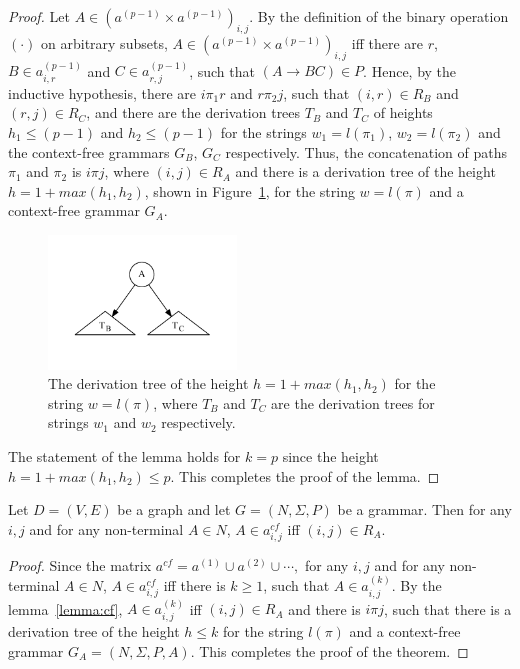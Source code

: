 \begin{proof}
Let $A \in (a^{(p-1)} \times a^{(p-1)})_{i,j}$. By the definition of the binary operation $(\cdot)$ on arbitrary subsets, $A \in (a^{(p-1)} \times a^{(p-1)})_{i,j}$ iff there are $r$, $B \in a^{(p-1)}_{i,r}$ and $C \in a^{(p-1)}_{r,j}$, such that $(A \rightarrow B C) \in P$. Hence, by the inductive hypothesis, there are $i \pi_1 r$ and $r \pi_2 j$, such that $(i,r) \in R_B$ and $(r,j) \in R_C$, and there are the derivation trees $T_B$ and $T_C$ of heights $h_1 \leq (p-1)$ and $h_2 \leq (p-1)$ for the strings $w_1 = l(\pi_1)$, $w_2 = l(\pi_2)$ and the context-free grammars $G_B$, $G_C$ respectively. Thus, the concatenation of paths $\pi_1$ and $\pi_2$ is $i \pi j$, where $(i,j) \in R_A$ and there is a derivation tree of the height $h = 1 + max(h_1, h_2)$, shown in Figure~\ref{tree2}, for the string $w = l(\pi)$ and a context-free grammar $G_A$.

\begin{figure}[h!]
 \centering
 \includegraphics[width=5cm]{pictures/tree2.pdf}
 \caption{The derivation tree of the height $h = 1 + max(h_1, h_2)$ for the string $w = l(\pi)$, where $T_B$ and $T_C$ are the derivation trees for strings $w_1$ and $w_2$ respectively.}
 \label{tree2}
\end{figure}

The statement of the lemma holds for $k = p$ since the height $h = 1 + max(h_1, h_2) \leq p$. This completes the proof of the lemma.
\end{proof}

\begin{mytheorem}\label{thm:correct}
 Let $D = (V,E)$ be a graph and let $G =(N,\Sigma,P)$ be a grammar. Then for any $i, j$ and for any non-terminal $A \in N$, $A \in a^{cf}_{i,j}$ iff $(i,j) \in R_A$.
\end{mytheorem}
\begin{proof}

Since the matrix $a^{cf} = a^{(1)} \cup a^{(2)} \cup \cdots,$ for any $i, j$ and for any non-terminal $A \in N$, $A \in a^{cf}_{i,j}$ iff there is $k \geq 1$, such that $A \in a^{(k)}_{i,j}$. By the lemma~\ref{lemma:cf}, $A \in a^{(k)}_{i,j}$ iff $(i,j) \in R_A$ and there is $i \pi j$, such that there is a derivation tree of the height $h \leq k$ for the string $l(\pi)$ and a context-free grammar $G_A = (N,\Sigma,P,A)$. This completes the proof of the theorem.
\end{proof}

